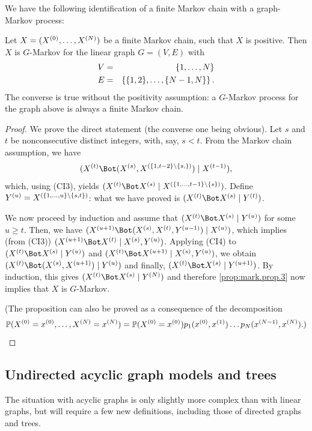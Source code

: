 We have the following identification of a finite Markov chain with a
graph-Markov process:
\begin{proposition}
\label{prop:m.chain}
Let $X=(X^{(0)}, \ldots, X^{(N)})$ be a finite Markov chain, such that $X$ is positive. Then $X$ is $G$-Markov for the linear graph $G=(V,E)$ with
\begin{eqnarray*}
V &=& \left\{ 1, \ldots, N \right\}\\
E &=& \left\{ \{1,2\}, \ldots, \{N-1, N\} \right\}.
\end{eqnarray*}
The converse is true without the positivity assumption: a $G$-Markov
process for the graph above is always a finite Markov chain. 
\end{proposition}
\begin{proof}
We prove the direct statement (the converse one being obvious).
Let $s$ and $t$ be nonconsecutive distinct integers, with, say,
$s<t$. From the Markov chain assumption, we have
$$
\cind{\pe Xt}{(\pe Xs, \pe X{\defset{1,t-2}\setm\{s,\}})}{\pe X{t-1}},
$$
 which, using
(CI3), yields $\cind{\pe Xt}{\pe Xs}{\pe X{\defset{1, \ldots,
t-1}\setm\{s\}}}$. Define $Y^{(u)} = X^{(\left\{ 1, \ldots,
u \right\}\setminus\{s,t\})}$: what we have proved is
$\cind{\pe Xt}{\pe Xs}{\pe Yt}$. 


We now proceed by induction and assume that $\cind{\pe Xt}{\pe Xs}{\pe Yu}$ for some
$u\geq t$. Then, we have
$\cind{\pe X{u+1}}{(\pe Xs, \pe Xt, \pe Y{u-1})}{\pe Xu}$, which implies (from (CI3))
$\cind{\pe X{u+1}}{\pe Xt}{\pe Xs,\pe Yu}$. Applying (CI4) to 
$\cind{\pe Xt}{\pe Xs}{\pe Yu}$ and $\cind{\pe X{t}}{\pe X{u+1}}{\pe Xs,\pe Yu}$, we obtain
$\cind{\pe Xt}{(\pe Xs, \pe X{u+1})}{\pe Yu}$ and finally,
$\cind{\pe Xt}{\pe Xs}{\pe Y{u+1}}$. By induction, this gives
$\cind{\pe Xt}{\pe Xs}{\pe YN}$ and therefore 
\cref{prop:mark.prop.3} now implies that  $X$ is $G$-Markov.

(The proposition can also be proved as a consequence of the
decomposition
\[
\bm{\mathbb P}(X^{(0)}=x^{(0)}, \ldots, X^{(N)}=x^{(N)}) = \bm{\mathbb P}(X^{(0)}= x^{(0)}) p_1(x^{(0)}, x^{(1)})\ldots
p_N(x^{(N-1)}, x^{(N)}).)
\]

\end{proof}




\subsection{Undirected acyclic graph models and trees}
The situation with acyclic graphs is only slightly more complex than
with linear graphs, but will require a few new definitions, including those of
directed graphs and trees.

